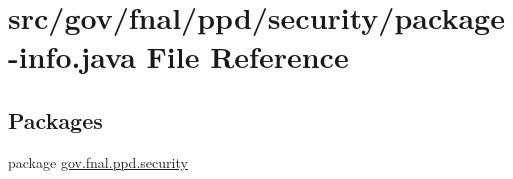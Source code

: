 \hypertarget{gov_2fnal_2ppd_2security_2package-info_8java}{\section{src/gov/fnal/ppd/security/package-\/info.java File Reference}
\label{gov_2fnal_2ppd_2security_2package-info_8java}
}
\subsection*{Packages}
\begin{DoxyCompactItemize}
\item 
package \hyperlink{namespacegov_1_1fnal_1_1ppd_1_1security}{gov.\-fnal.\-ppd.\-security}
\end{DoxyCompactItemize}
